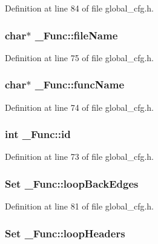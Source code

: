 Definition at line 84 of file global\_\-cfg.h.
\subsubsection{\setlength{\rightskip}{0pt plus 5cm}char$\ast$ \bf{\_\-Func::file\-Name}}\label{struct__Func_4c9e073955b3709bd989a810199ba8ae}




Definition at line 75 of file global\_\-cfg.h.
\subsubsection{\setlength{\rightskip}{0pt plus 5cm}char$\ast$ \bf{\_\-Func::func\-Name}}\label{struct__Func_136b5640e5555d16fd06a1c89cc2c0ff}




Definition at line 74 of file global\_\-cfg.h.
\subsubsection{\setlength{\rightskip}{0pt plus 5cm}int \bf{\_\-Func::id}}\label{struct__Func_a2d34c4b37a6c17f38ad4b6bc8171fdd}




Definition at line 73 of file global\_\-cfg.h.
\subsubsection{\setlength{\rightskip}{0pt plus 5cm}\bf{Set} \bf{\_\-Func::loop\-Back\-Edges}}\label{struct__Func_001cbdd633bb1314a25efc6fe799859b}




Definition at line 81 of file global\_\-cfg.h.
\subsubsection{\setlength{\rightskip}{0pt plus 5cm}\bf{Set} \bf{\_\-Func::loop\-Headers}}\label{struct__Func_ea5ece741b33ec7776c0d78fcb54d1e3}




